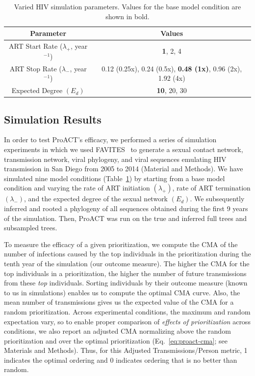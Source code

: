 \begin{table}[!ht] %
\caption[Varied Simulation Parameters]{Varied \gls{HIV} simulation parameters. Values for the base model condition are shown in bold.}
\vspace{-0.25in}
\begin{center}
\begin{tabular}{|c|c|}
\hline
\textbf{Parameter} & \textbf{Values}\\
\hline
\gls{ART} Start Rate ($\lambda_+$, year$^{-1}$) & \textbf{1}, 2, 4\\
\hline
\gls{ART} Stop Rate ($\lambda_-$, year$^{-1}$) & 0.12 (0.25x), 0.24 (0.5x), \textbf{0.48 (1x)}, 0.96 (2x), 1.92 (4x)\\
\hline
Expected Degree $\left(E_d\right)$ & \textbf{10}, 20, 30\\
\hline
\end{tabular}
\end{center}
\label{tab:proact-favites}
\end{table}

\subsection{Simulation Results}
In order to test ProACT's efficacy, we performed a series of simulation experiments in which we used FAVITES~\cite{Moshiri2018} to generate a sexual contact network, transmission network, viral phylogeny, and viral sequences emulating \gls{HIV} transmission in San Diego from 2005 to 2014 (Material and Methods). We have simulated nine model conditions (Table~\ref{tab:proact-favites}) by starting from a base model condition and varying the rate of \gls{ART} initiation $(\lambda_+)$, rate of \gls{ART} termination $(\lambda_-)$, and the expected degree of the sexual network $(E_d)$. We subsequently inferred and rooted a phylogeny of all sequences obtained during the first 9 years of the simulation. Then, ProACT was run on the true and inferred full trees and subsampled trees.

To measure the efficacy of a given prioritization, we compute the \gls{CMA} of the number of infections caused by the top individuals in the prioritization during the tenth year of the simulation (our outcome measure). The higher the \gls{CMA} for the top individuals in a prioritization, the higher the number of future transmissions from these \textit{top} individuals. Sorting individuals by their outcome measure (known to us in simulations) enables us to compute the optimal \gls{CMA} curve. Also, the mean number of transmissions gives us the expected value of the \gls{CMA} for a random prioritization. Across experimental conditions, the maximum and random expectation vary, so to enable proper comparison of \textit{effects of prioritization} across conditions, we also report an adjusted \gls{CMA} normalizing above the random prioritization and over the optimal prioritization (Eq.~\ref{eq:proact-cma}; see Materials and Methods). Thus, for this Adjusted Transmissions/Person metric, 1 indicates the optimal ordering and 0 indicates ordering that is no better than random.

